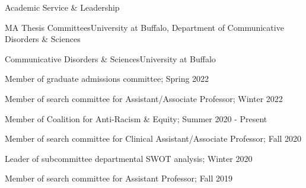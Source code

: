 \documentclass{resume} %
\begin{document}
\begin{rSection}{Academic Service \& Leadership}
\begin{rSubsection}{MA Thesis Committees}{}{University at Buffalo, Department of Communicative Disorders \& Sciences}{}


\begin{rSubsection}{Communicative Disorders \& Sciences}{}{University at Buffalo}{}
	\item Member of graduate admissions committee; Spring 2022
	\item Member of search committee for Assistant/Associate Professor; Winter 2022
	\item Member of Coalition for Anti-Racism \& Equity; Summer 2020 - Present
	\item Member of search committee for Clinical Assistant/Associate Professor; Fall 2020
	\item Leader of subcommittee departmental SWOT analysis; Winter 2020
	\item Member of search committee for Assistant Professor; Fall 2019
\end{rSubsection}

%	
%
%
%	


\end{rSubsection}
\end{rSection}
\end{document}
